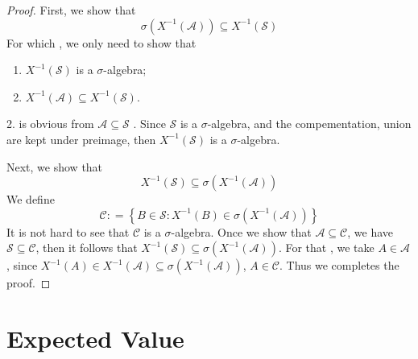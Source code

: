 \documentclass[../main.tex]{subfiles}
\begin{document}
\begin{proof}
    First, we show that \[
     \sigma \left( X ^{-1} \left( \mathcal{A} \right)  \right)\subseteq X ^{-1} \left( \mathcal{S} \right)  
    \] For which , we only need to show that 
    \begin{enumerate}
        \item \(  X ^{-1} \left( \mathcal{S} \right)   \) is a \(   \sigma   \)-algebra;
        \item \(  X ^{-1} \left( \mathcal{A} \right)\subseteq  X ^{-1} \left( \mathcal{S} \right)    \).   
    \end{enumerate}
   2. is obvious from \(  \mathcal{A}\subseteq \mathcal{S}  \) . Since \(  \mathcal{S}  \) is a \(   \sigma   \)-algebra, and the compementation, union are kept  under preimage, then \(  X ^{-1} \left( \mathcal{S} \right)   \) is a \(   \sigma   \)-algebra.  

   Next, we show that \[
   X ^{-1} \left( \mathcal{S} \right)\subseteq   \sigma \left( X ^{-1} \left( \mathcal{A} \right) \right)  
   \]We define \[
   \mathcal{C}: = \left\{ B\in \mathcal{S}: X ^{-1} \left( B \right)\in  \sigma \left( X ^{-1} \left( \mathcal{A} \right)  \right)   \right\}
   \] It is not hard to see that \(  \mathcal{C}  \) is a \(   \sigma   \)-algebra. Once we show that \(  \mathcal{A}\subseteq \mathcal{C}  \), we have \(  \mathcal{S}\subseteq \mathcal{C}  \), then it follows that  \(  X ^{-1} \left( \mathcal{S} \right)\subseteq  \sigma \left( X ^{-1} \left( \mathcal{A} \right)  \right)    \). For that , we take \(  A\in \mathcal{A}  \), since \(  X ^{-1} \left( A \right)\in  X ^{-1} \left( \mathcal{A} \right)\subseteq  \sigma \left( X ^{-1} \left( \mathcal{A} \right)  \right)     \),  \(  A \in \mathcal{C}  \). Thus we completes the proof.        
\end{proof}

\section{Expected Value}
\end{document}
